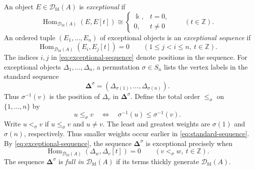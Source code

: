 \documentclass[11pt,a4paper]{article}
\newcommand{\defn}[1]{\textsl{\color{darkblue} #1}}
\newcommand{\D}{\mathcal D}
\newcommand{\ZZ}{\mathbb{Z}}
\newcommand{\std}{\Delta}
\DeclareMathOperator{\fd}{fd}
\DeclareMathOperator{\Hom}{Hom}
\theoremstyle{plain}
\theoremstyle{definition}
\numberwithin{equation}{section}
\begin{document}
An object $E\in\D_{\fd}(A)$ is \defn{exceptional} if
\begin{equation}\label{eq:exceptional}
 \Hom_{\D_{\fd}(A)}(E,E[t])\cong
 \begin{cases}\Bbbk,&t=0,\\0,&t\neq0\end{cases}
\qquad(t\in\ZZ).
\end{equation}
An ordered tuple $(E_1,\ldots,E_n)$ of exceptional objects is an
\defn{exceptional sequence} if
\begin{equation}\label{eq:exceptional-sequence}
 \Hom_{\D_{\fd}(A)}(E_i,E_j[t])=0
 \qquad(1\leq j<i\leq n,\ t\in\ZZ).
\end{equation}
The indices $i,j$ in \eqref{eq:exceptional-sequence} denote positions
in the sequence.
For exceptional objects $\std_1,\ldots,\std_n$, a permutation
$\sigma\in S_n$ lists the vertex labels in the standard sequence
\begin{equation}\label{eq:standard-sequence}
 \boldsymbol\std^\sigma
 =(\std_{\sigma(1)},\ldots,\std_{\sigma(n)}).
\end{equation}
Thus $\sigma^{-1}(v)$ is the position of $\std_v$ in
$\boldsymbol\std^\sigma$. Define the total order $\leq_\sigma$ on
$\{1,\ldots,n\}$ by
\begin{equation}\label{eq:order}
 u\leq_\sigma v\quad\Longleftrightarrow\quad
 \sigma^{-1}(u)\leq\sigma^{-1}(v).
\end{equation}
Write $u<_\sigma v$ if $u\leq_\sigma v$ and $u\neq v$.
The least and greatest weights are $\sigma(1)$ and $\sigma(n)$,
respectively. Thus smaller weights occur earlier in
\eqref{eq:standard-sequence}. By \eqref{eq:exceptional-sequence},
the sequence $\boldsymbol\std^\sigma$ is exceptional precisely when
\begin{equation}\label{eq:semiorthogonal}
 \Hom_{\D_{\fd}(A)}(\std_w,\std_v[t])=0
 \qquad(v<_\sigma w,\ t\in\ZZ).
\end{equation}
The sequence $\boldsymbol\std^\sigma$ is \defn{full in $\D_{\fd}(A)$}
if its terms thickly generate $\D_{\fd}(A)$.
\end{document}
